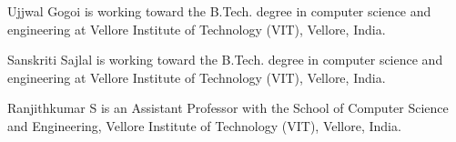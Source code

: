 \documentclass[journal]{IEEEtran}
\begin{document}
\begin{IEEEbiographynophoto}{Ujjwal Gogoi}
is working toward the B.Tech. degree in computer science and engineering at Vellore
Institute of Technology (VIT), Vellore, India.
\end{IEEEbiographynophoto}

\begin{IEEEbiographynophoto}{Sanskriti Sajlal}
is working toward the B.Tech. degree in computer science and engineering at Vellore
Institute of Technology (VIT), Vellore, India.
\end{IEEEbiographynophoto}

\begin{IEEEbiographynophoto}{Ranjithkumar S}
is an Assistant Professor with the School of Computer Science and Engineering, Vellore
Institute of Technology (VIT), Vellore, India.
\end{IEEEbiographynophoto}

\vfill
\end{document}
